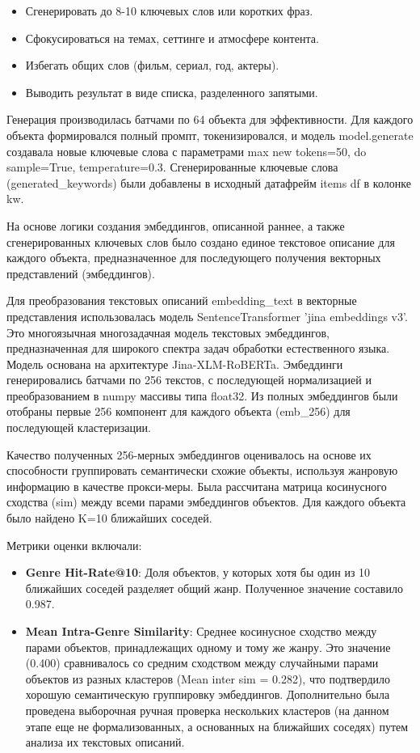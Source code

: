 \begin{itemize}
    \item Сгенерировать до 8-10 ключевых слов или коротких фраз.
    \item Сфокусироваться на темах, сеттинге и атмосфере контента.
    \item Избегать общих слов (фильм, сериал, год, актеры).
    \item Выводить результат в виде списка, разделенного запятыми.
\end{itemize}

Генерация производилась батчами по 64 объекта для эффективности. Для каждого объекта формировался полный промпт, токенизировался, и модель model.generate создавала новые ключевые слова с параметрами max new tokens=50, do sample=True, temperature=0.3. Сгенерированные ключевые слова (generated\_keywords) были добавлены в исходный датафрейм items df в колонке kw.

На основе логики создания эмбеддингов, описанной раннее, а также сгенерированных ключевых слов было создано единое текстовое описание для каждого объекта, предназначенное для последующего получения векторных представлений (эмбеддингов).

Для преобразования текстовых описаний embedding\_text в векторные представления использовалась модель SentenceTransformer 'jina embeddings v3'. Это многоязычная многозадачная модель текстовых эмбеддингов, предназначенная для широкого спектра задач обработки естественного языка. Модель основана на архитектуре Jina-XLM-RoBERTa. Эмбеддинги генерировались батчами по 256 текстов, с последующей нормализацией и преобразованием в numpy массивы типа float32. Из полных эмбеддингов были отобраны первые 256 компонент для каждого объекта (emb\_256) для последующей кластеризации.

Качество полученных 256-мерных эмбеддингов оценивалось на основе их способности группировать семантически схожие объекты, используя жанровую информацию в качестве прокси-меры.
Была рассчитана матрица косинусного сходства (sim) между всеми парами эмбеддингов объектов. Для каждого объекта было найдено K=10 ближайших соседей.

Метрики оценки включали:
\begin{itemize}
    \item \textbf{Genre Hit-Rate@10}: Доля объектов, у которых хотя бы один из 10 ближайших соседей разделяет общий жанр. Полученное значение составило 0.987.
    \item \textbf{Mean Intra-Genre Similarity}: Среднее косинусное сходство между парами объектов, принадлежащих одному и тому же жанру. Это значение (0.400) сравнивалось со средним сходством между случайными парами объектов из разных кластеров (Mean inter sim = 0.282), что подтвердило хорошую семантическую группировку эмбеддингов. Дополнительно была проведена выборочная ручная проверка нескольких кластеров (на данном этапе еще не формализованных, а основанных на ближайших соседях) путем анализа их текстовых описаний.
\end{itemize}

